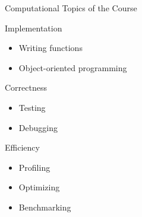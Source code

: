 \documentclass[
  ignorenonframetext,
  aspectratio=1610,
  onlytextwidth]{beamer}
\providecommand{\tightlist}{}
\begin{document}
\begin{frame}{Computational Topics of the Course}
\label{computational-topics-of-the-course}
\begin{block}{Implementation}
\label{implementation}
\begin{itemize}[<+->]
\tightlist
\item
  Writing functions
\item
  Object-oriented programming
\end{itemize}

\pause
\end{block}

\begin{block}{Correctness}
\label{correctness}
\begin{itemize}[<+->]
\tightlist
\item
  Testing
\item
  Debugging
\end{itemize}

\pause
\end{block}

\begin{block}{Efficiency}
\label{efficiency}
\begin{itemize}[<+->]
\tightlist
\item
  Profiling
\item
  Optimizing
\item
  Benchmarking
\end{itemize}
\end{block}
\end{frame}
\end{document}
